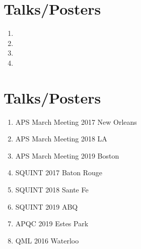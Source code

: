 \documentclass[a4paper,10pt]{article}
\begin{document}
%


\section{Talks/Posters}
\begin{enumerate}
\item {}
\item {}
\item {}
\item {}
\end{enumerate}

\section{Talks/Posters}
\begin{enumerate}
\item APS March Meeting 2017	New Orleans
\item APS March Meeting 2018	LA
\item APS March Meeting 2019	Boston
\item SQUINT 2017 Baton Rouge
\item SQUINT 2018 Sante Fe
\item SQUINT 2019 ABQ
\item APQC 2019 Estes Park
\item QML 2016 Waterloo
\end{enumerate}
\end{document}
